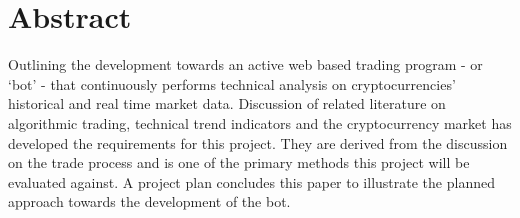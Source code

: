 %

%
\chapter*{Abstract}
\label{sec:abstract}
\thispagestyle{empty}

Outlining the development towards an active web based trading program - or `bot' - that continuously performs technical analysis on cryptocurrencies' historical and real time market data. Discussion of related literature on algorithmic trading, technical trend indicators and the cryptocurrency market has developed the requirements for this project. They are derived from the discussion on the trade process and is one of the primary methods this project will be evaluated against. A project plan concludes this paper to illustrate the planned approach towards the development of the bot.

\newpage





